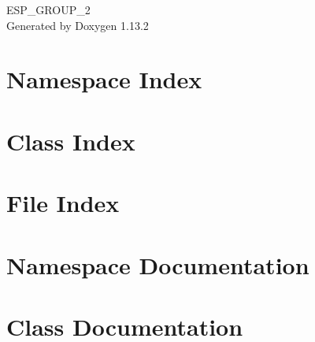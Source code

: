 \documentclass[twoside]{book}
\newcommand{\+}{\discretionary{\mbox{\scriptsize$\hookleftarrow$}}{}{}}
\newcommand{\clearemptydoublepage}{%
    \newpage{\pagestyle{empty}\cleardoublepage}%
  }
\begin{document}
  \raggedbottom
    \hypersetup{pageanchor=false,
                bookmarksnumbered=true,
                pdfencoding=unicode
               }
  \begin{titlepage}
  \vspace*{7cm}
  \begin{center}%
  {\Large ESP\+\_\+\+GROUP\+\_\+2}\\
  \vspace*{1cm}
  {\large Generated by Doxygen 1.13.2}\\
  \end{center}
  \end{titlepage}
  \clearemptydoublepage
  \tableofcontents
  \clearemptydoublepage
  \hypersetup{pageanchor=true}
\chapter{Namespace Index}

\chapter{Class Index}

\chapter{File Index}

\chapter{Namespace Documentation}

\chapter{Class Documentation}











\end{document}
